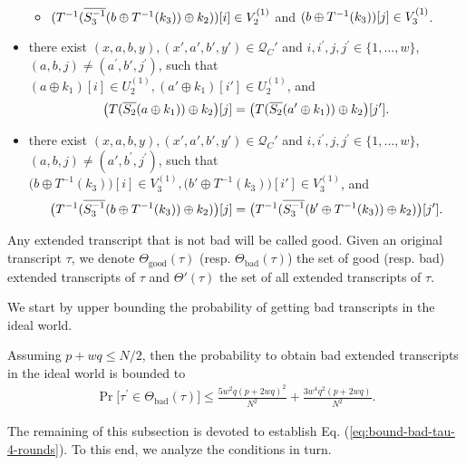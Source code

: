 \documentclass[journal=tosc,final,nohyperref]{iacrtrans}
\begin{document}
\begin{definition}
\begin{itemize}[leftmargin=10mm]
\begin{itemize}
			\item $(T^{-1}(\overline{S_3^{-1}}(b\oplus T^{-1}(k_3))\oplus k_2))[i]\in V_2^{(1)}$ and $(b\oplus T^{-1}(k_3))[j]\in V_{3}^{(1)}$.
		\end{itemize}
		\item[\bfour] there exist $(x,a,b,y),(x',a',b',y') \in \mathcal{Q}_{C}'$ and $i, i^{\prime},j, j^{\prime} \in\{1, \ldots, w\}$, $(a,b, j) \neq \left(a^{\prime}, b',j^{\prime}\right)$, such that $(a \oplus k_1)[i]\in U_{2}^{(1)}, (a' \oplus k_1)[i']\in U_{2}^{(1)}$, and
		$$\big(T(\overline{S_2}(a\oplus k_1))\oplus k_2\big)[j]=\big(T(\overline{S_2}(a'\oplus k_1))\oplus k_2\big)[j'].
		$$
		\item[\bfive] there exist $(x,a,b,y),(x',a',b',y') \in \mathcal{Q}_{C}'$ and $i, i^{\prime}, j, j^{\prime} \in\{1, \ldots, w\}$, $(a,b, j) \neq \left(a',b^{\prime}, j^{\prime}\right)$, such that $\big(b \oplus T^{-1}(k_3)\big)[i]\in V_{3}^{(1)}, \big(b' \oplus T^{-1}(k_3)\big)[i']\in V_{3}^{(1)}$, and
		$$\big(T^{-1}(\overline{S_3^{-1}}(b \oplus T^{-1}(k_3))\oplus k_2)\big)[j]=\big(T^{-1}(\overline{S_3^{-1}}(b' \oplus T^{-1}(k_3))\oplus k_2)\big)[j'].
		$$
	\end{itemize}
	Any extended transcript that is not bad will be called good. Given an original transcript $\tau$, we denote $\Theta_{\mathrm{good}}(\tau)$ (resp. $\Theta_{\mathrm{bad}}(\tau)$) the set of good (resp. bad) extended transcripts of $\tau$ and $\Theta'(\tau)$ the set of all extended transcripts of $\tau$.
\end{definition}



We start by upper bounding the probability of getting bad transcripts in the ideal world.

\begin{lemma}
	\label{lemma:bad-tau-4-rounds}
	
	Assuming $p+wq\leq N/2$, then the probability to obtain bad extended transcripts in the ideal world is bounded to
	\begin{align}
	{\Pr}\big[\tau^{\prime} \in \Theta_{\mathrm{bad}}(\tau)\big] \leq \frac{5w^2q(p+2wq)^2}{N^2}+
	\frac{3w^4q^2(p+2wq)}{N^2}.
	\label{eq:bound-bad-tau-4-rounds}
	\end{align}
\end{lemma}

The remaining of this subsection is devoted to establish Eq. (\ref{eq:bound-bad-tau-4-rounds}). To this end, we analyze the conditions in turn.
\end{document}
